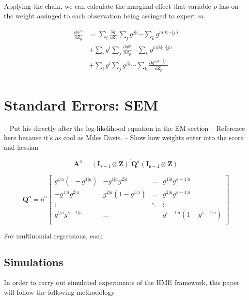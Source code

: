 \documentclass[12pt]{article}
\begin{document}
Applying the chain, we can calculate the marginal effect that variable $p$ has on the weight assinged to each observation being assinged to expert $m$.

\begin{equation}
  \begin{split}
    \frac{\partial w^{m}}{\partial Z_{p}} &= \sum_{i} \frac{\partial g^{i}}{\partial Z_{p}} \sum_{j} g^{j|i} \cdots \sum_{k} g^{m|k|\cdots|j|i} \\
    &+ \sum_{i} g^{i} \sum_{j} \frac{\partial g^{j|i}}{\partial Z_{p}} \cdots \sum_{k} g^{m|k|\cdots|j|i} \\
    &+ \sum_{i} g^{i} \sum_{j} g^{j|i} \cdots \sum_{k} \frac{\partial g^{m|k|\cdots|j|i}}{\partial Z_{p}} \\
  \end{split}
\end{equation}


\section{Standard Errors: SEM} \label{standarderrors}
-- Put his directly after the log-likelihood equation in the EM section
-- Reference \cite{MengRubinSEM1991} here because it's as cool as Miles Davis.
-- Show how weights enter into the score and hessian


\begin{equation} \label{eq:nodehessianQ}
  \mathbf{A}^{a} = (\mathbf{I}_{s-1} \otimes \mathbf{Z})^{\prime} \mathbf{Q}^{a} (\mathbf{I_{s-1}} \otimes \mathbf{Z})
\end{equation}

\begin{equation} \label{eq:}
  \mathbf{Q^{a}} = h^{a} \begin{bmatrix}
     g^{1|a}(1-g^{1|a}) & -g^{1|a}g^{2|a}    & \dots  & g^{1|a}g^{s-1|a}       \\
     -g^{1|a}g^{2|a}    & g^{2|a}(1-g^{1|a}) & \dots  & g^{2|a}g^{s-1|a}       \\
     \vdots             &                    & \ddots & \vdots                 \\
     g^{1|a}g^{s-1|a}   &  \dots             &        & g^{s-1|a}(1-g^{s-1|a}) \\
  \end{bmatrix}
\end{equation}

For multinomial regressions, each 

\subsection{Simulations}
In order to carry out simulated experiments of the HME framework, this paper will follow the following methodology.
\end{document}
